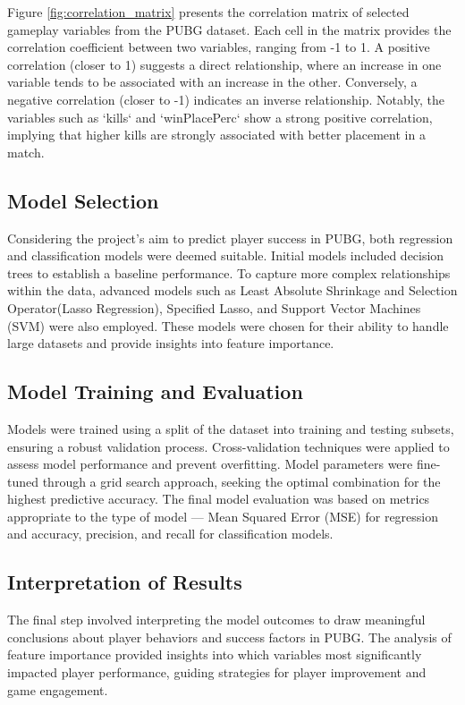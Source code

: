 \documentclass[12pt]{article}
\begin{document}
Figure \ref{fig:correlation_matrix} presents the correlation matrix of selected gameplay variables from the PUBG dataset. Each cell in the matrix provides the correlation coefficient between two variables, ranging from -1 to 1. A positive correlation (closer to 1) suggests a direct relationship, where an increase in one variable tends to be associated with an increase in the other. Conversely, a negative correlation (closer to -1) indicates an inverse relationship. Notably, the variables such as `kills` and `winPlacePerc` show a strong positive correlation, implying that higher kills are strongly associated with better placement in a match.






\subsection{Model Selection}
Considering the project's aim to predict player success in PUBG, both regression and classification models were deemed suitable. Initial models included decision trees to establish a baseline performance. To capture more complex relationships within the data, advanced models such as Least Absolute Shrinkage and Selection Operator(Lasso Regression), Specified Lasso, and Support Vector Machines (SVM) were also employed. These models were chosen for their ability to handle large datasets and provide insights into feature importance.


\subsection{Model Training and Evaluation}
Models were trained using a split of the dataset into training and testing subsets, ensuring a robust validation process. Cross-validation techniques were applied to assess model performance and prevent overfitting. Model parameters were fine-tuned through a grid search approach, seeking the optimal combination for the highest predictive accuracy. The final model evaluation was based on metrics appropriate to the type of model — Mean Squared Error (MSE) for regression and accuracy, precision, and recall for classification models.


\subsection{Interpretation of Results}
The final step involved interpreting the model outcomes to draw meaningful conclusions about player behaviors and success factors in PUBG. The analysis of feature importance provided insights into which variables most significantly impacted player performance, guiding strategies for player improvement and game engagement.
\end{document}
